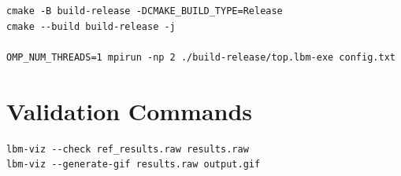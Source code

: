 \documentclass[11pt,a4paper]{article}
\begin{document}
\begin{lstlisting}[basicstyle=\ttfamily\small,frame=single]
cmake -B build-release -DCMAKE_BUILD_TYPE=Release
cmake --build build-release -j

OMP_NUM_THREADS=1 mpirun -np 2 ./build-release/top.lbm-exe config.txt
\end{lstlisting}

\section{Validation Commands}

\begin{lstlisting}[basicstyle=\ttfamily\small,frame=single]
lbm-viz --check ref_results.raw results.raw
lbm-viz --generate-gif results.raw output.gif
\end{lstlisting}
\end{document}
